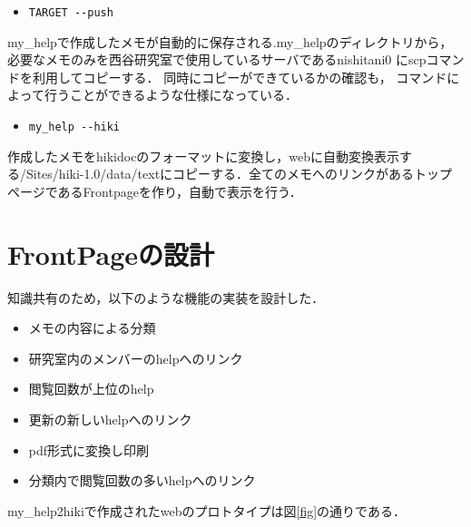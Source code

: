 \documentclass[10pt,a4j,twocolumn]{jsarticle}
\begin{document}
\begin{itemize}
\item \verb|TARGET --push|
\end{itemize}
\begin{description}
\item my\_helpで作成したメモが自動的に保存される.my\_helpのディレクトリから，
必要なメモのみを西谷研究室で使用しているサーバであるnishitani0
にscpコマンドを利用してコピーする．
同時にコピーができているかの確認も，
コマンドによって行うことができるような仕様になっている．
\end{description}
\begin{itemize}
\item \verb|my_help --hiki|
\end{itemize}
\begin{description}
\item 作成したメモをhikidocのフォーマットに変換し，webに自動変換表示する/Sites/hiki-1.0/data/textにコピーする．全てのメモへのリンクがあるトップページであるFrontpageを作り，自動で表示を行う．
\end{description}

\section{FrontPageの設計}
知識共有のため，以下のような機能の実装を設計した．
\begin{itemize}
\item メモの内容による分類
\item 研究室内のメンバーのhelpへのリンク
\item 閲覧回数が上位のhelp
\item 更新の新しいhelpへのリンク
\item pdf形式に変換し印刷
\item 分類内で閲覧回数の多いhelpへのリンク
\end{itemize}

my\_help2hikiで作成されたwebのプロトタイプは図\ref{fig}の通りである．
\end{document}
